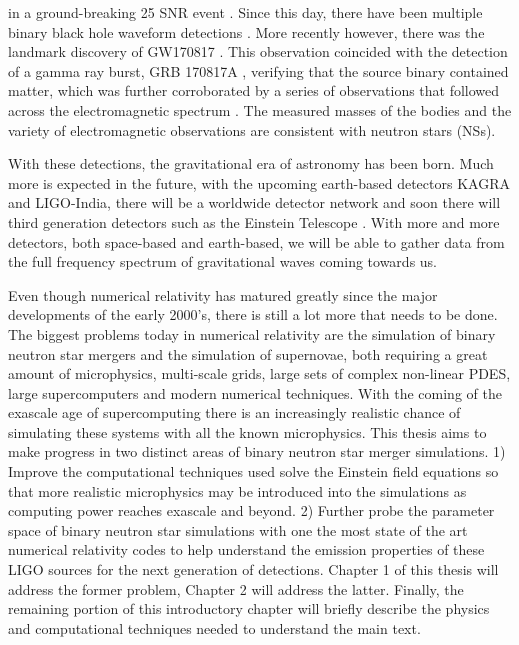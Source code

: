 in a ground-breaking 25 SNR event \cite{theligoscientific:2016wfe}. Since this day, there have been multiple binary black hole waveform detections \cite{ligo2018gwtc}. More recently however, there was the landmark discovery of GW170817 \cite{abbott2017gw170817}. This observation
coincided with the detection of a gamma ray burst, GRB 170817A \cite{2017apj...848l..13a}, verifying that the source binary contained matter, which was further corroborated by a series of observations that followed across the electromagnetic spectrum \cite{villar:2017wcc}. The measured masses of the bodies and the variety of electromagnetic observations are consistent with neutron stars (NSs).

With these detections, the gravitational era of astronomy has been born. Much more is expected in the future, with the upcoming earth-based detectors KAGRA and LIGO-India, there will be a worldwide detector network and soon there will third generation detectors such as the Einstein Telescope \cite{einsteintelescope}. With more and more detectors, both space-based and earth-based, we will be able to gather data from the full frequency spectrum of gravitational waves coming towards us.

Even though numerical relativity has matured greatly since the major developments of the early 2000's, there is still a lot more that needs to be done. The biggest problems today in numerical relativity are the simulation of binary neutron star mergers and the simulation of supernovae, both requiring a great amount of microphysics, multi-scale grids, large sets of complex non-linear PDES, large supercomputers and modern numerical techniques. With the coming of the exascale age of supercomputing there is an increasingly realistic chance of simulating these systems with all the known microphysics. This thesis aims to make progress in two distinct areas of  binary neutron star merger simulations. 1) Improve the computational techniques used solve the Einstein field equations so that more realistic microphysics may be introduced into the simulations as computing power reaches exascale and beyond. 2) Further probe the parameter space of binary neutron star simulations with one the most state of the art numerical relativity codes to help understand the emission properties of these LIGO sources for the next generation of detections. Chapter 1 of this thesis will address the former problem, Chapter 2 will address the latter. Finally, the remaining portion of this introductory chapter will briefly describe the physics and computational techniques needed to understand the main text.

